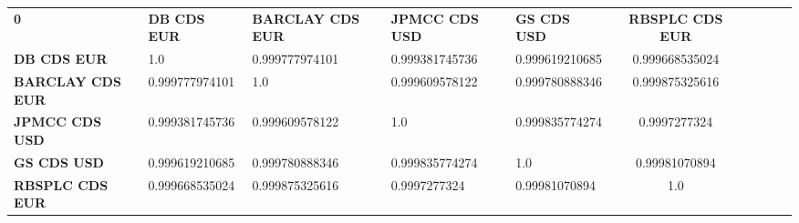 \begin{center}
 \begin{tabular}{|l|l|l|l|l|c|c|c|c|c|}
\hline
\textbf{0} & \textbf{DB CDS EUR} & \textbf{BARCLAY CDS EUR} & \textbf{JPMCC CDS USD} & \textbf{GS CDS USD} & \textbf{RBSPLC CDS EUR}\\\hhline{|=|=|=|=|=|=|}
\textbf{DB CDS EUR} & 1.0 & 0.999777974101 & 0.999381745736 & 0.999619210685 & 0.999668535024\\
\textbf{BARCLAY CDS EUR} & 0.999777974101 & 1.0 & 0.999609578122 & 0.999780888346 & 0.999875325616\\
\textbf{JPMCC CDS USD} & 0.999381745736 & 0.999609578122 & 1.0 & 0.999835774274 & 0.9997277324\\
\textbf{GS CDS USD} & 0.999619210685 & 0.999780888346 & 0.999835774274 & 1.0 & 0.99981070894\\
\textbf{RBSPLC CDS EUR} & 0.999668535024 & 0.999875325616 & 0.9997277324 & 0.99981070894 & 1.0\\
\hline
\end{tabular}
\end{center}